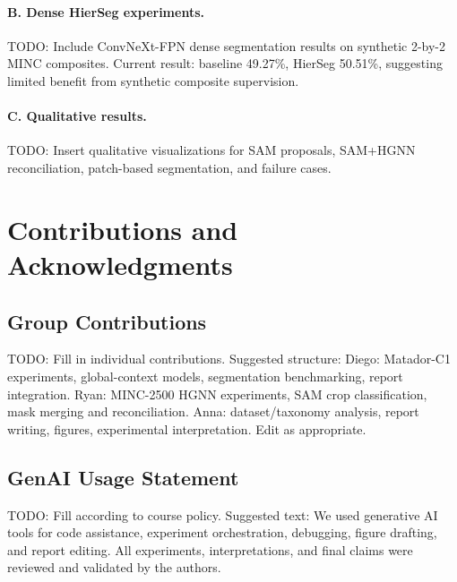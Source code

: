 \documentclass[11pt,twocolumn,letterpaper]{article}
\begin{document}
\paragraph{B. Dense HierSeg experiments.}
TODO: Include ConvNeXt-FPN dense segmentation results on synthetic 2-by-2 MINC composites. Current result: baseline 49.27\%, HierSeg 50.51\%, suggesting limited benefit from synthetic composite supervision.

\paragraph{C. Qualitative results.}
TODO: Insert qualitative visualizations for SAM proposals, SAM+HGNN reconciliation, patch-based segmentation, and failure cases.

\section{Contributions and Acknowledgments}

\subsection{Group Contributions}
TODO: Fill in individual contributions. Suggested structure: Diego: Matador-C1 experiments, global-context models, segmentation benchmarking, report integration. Ryan: MINC-2500 HGNN experiments, SAM crop classification, mask merging and reconciliation. Anna: dataset/taxonomy analysis, report writing, figures, experimental interpretation. Edit as appropriate.

\subsection{GenAI Usage Statement}
TODO: Fill according to course policy. Suggested text: We used generative AI tools for code assistance, experiment orchestration, debugging, figure drafting, and report editing. All experiments, interpretations, and final claims were reviewed and validated by the authors.

{\small


}
\end{document}
